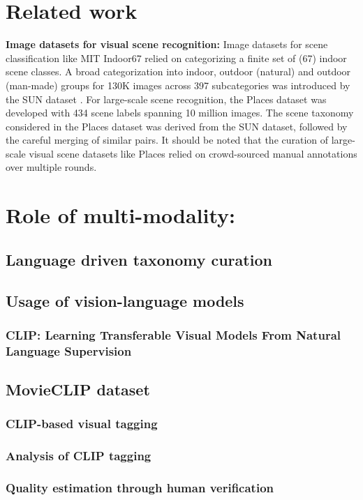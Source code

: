 \section{Related work}
\textbf{Image datasets for visual scene recognition:}
Image datasets for scene classification like MIT Indoor67 \cite{IndoorScenes} relied on categorizing a finite set of (67) indoor scene classes. A broad categorization into indoor, outdoor (natural) and outdoor (man-made) groups for 130K images across 397 subcategories was introduced by the SUN dataset \cite{xiao_sun_2016}. For large-scale scene recognition, the Places dataset \cite{zhou2017places} was developed with 434 scene labels spanning 10 million images. The scene taxonomy considered in the Places dataset was derived from the SUN dataset, followed by the careful merging of similar pairs. It should be noted that the curation of large-scale visual scene datasets like Places relied on crowd-sourced manual annotations over multiple rounds.\\
\section{Role of multi-modality:}
    \subsection{Language driven taxonomy curation}
    \subsection{Usage of vision-language models}
    \subsubsection{CLIP: Learning Transferable Visual Models From Natural Language Supervision}
    \subsection{MovieCLIP dataset}
    \subsubsection{CLIP-based visual tagging}
    \subsubsection{Analysis of CLIP tagging}
    \subsubsection{Quality estimation through human verification}
